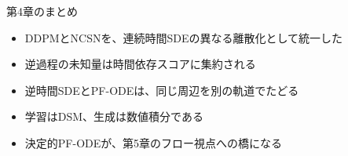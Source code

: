 \asmain
\begin{frame}{第4章のまとめ}
    \begin{itemize}
        \item DDPMとNCSNを、連続時間SDEの異なる離散化として統一した
        \item 逆過程の未知量は時間依存スコアに集約される
        \item 逆時間SDEとPF-ODEは、同じ周辺を別の軌道でたどる
        \item 学習はDSM、生成は数値積分である
        \item 決定的PF-ODEが、第5章のフロー視点への橋になる
    \end{itemize}
\end{frame}
